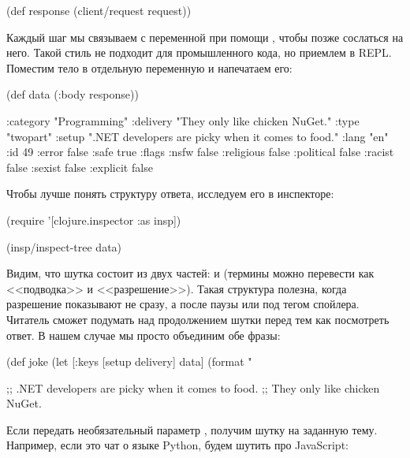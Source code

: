\begin{english}
  \begin{clojure}
(def response
  (client/request request))
  \end{clojure}
\end{english}

Каждый шаг мы связываем с переменной при помощи , чтобы позже сослаться на него. Такой стиль не подходит для промышленного кода, но приемлем в REPL. Поместим тело в отдельную переменную и напечатаем его:

\begin{english}
  \begin{clojure}
(def data
  (:body response))

{:category "Programming"
 :delivery "They only like chicken NuGet."
 :type "twopart"
 :setup ".NET developers are picky when it comes to food."
 :lang "en"
 :id 49
 :error false
 :safe true
 :flags
 {:nsfw false
  :religious false
  :political false
  :racist false
  :sexist false
  :explicit false}}
  \end{clojure}
\end{english}

Чтобы лучше понять структуру ответа, исследуем его в инспекторе:

\begin{english}
  \begin{clojure}
(require '[clojure.inspector :as insp])

(insp/inspect-tree data)
  \end{clojure}
\end{english}

Видим, что шутка состоит из двух частей:  и  (термины можно перевести как <<подводка>> и <<разрешение>>). Такая структура полезна, когда разрешение показывают не сразу, а после паузы или под тегом спойлера. Читатель сможет подумать над продолжением шутки перед тем как посмотреть ответ. В нашем случае мы просто объединим обе фразы:

\begin{english}
  \begin{clojure}
(def joke
  (let [{:keys [setup
                delivery]} data]
    (format "%

;; .NET developers are picky when it comes to food.
;; They only like chicken NuGet.
  \end{clojure}
\end{english}

Если передать необязательный параметр , получим шутку на заданную тему. Например, если это чат о языке Python, будем шутить про JavaScript:

